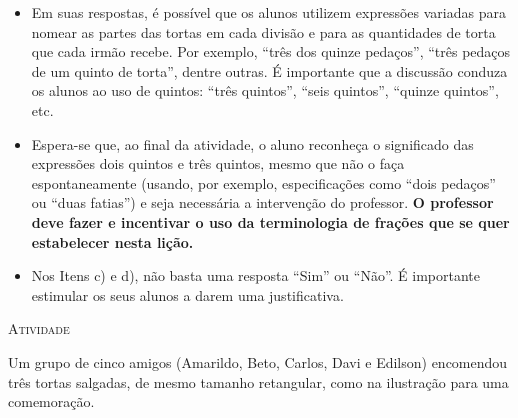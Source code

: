 \documentclass[10 pt,usenames,dvipsnames, oneside]{article}
\begin{document}
\begin{goals}
\begin{itemize}
    \item       Em suas respostas, é possível que os alunos utilizem expressões variadas para nomear as partes das tortas em cada divisão e para as quantidades de torta que cada irmão recebe. Por exemplo,       ``três dos quinze pedaços'',       ``três pedaços de um quinto de torta'', dentre outras. É importante que a discussão conduza os alunos ao uso de quintos:       ``três quintos'',       ``seis quintos'',       ``quinze quintos'', etc.
    \item       Espera-se que, ao final da atividade, o aluno reconheça o significado das expressões dois quintos e três quintos, mesmo que não o faça espontaneamente (usando, por exemplo, especificações como       ``dois pedaços''     ou       ``duas fatias'') e seja necessária a intervenção do professor. {\bf O professor deve fazer e incentivar o uso da terminologia de frações que se quer estabelecer nesta lição.}
    \item       Nos Itens c) e d), não basta uma resposta       ``Sim''     ou       ``Não''. É importante estimular os seus alunos a darem uma justificativa.
\end{itemize} %


\end{goals}

\bigskip
\begin{center}
{\large \scshape Atividade}
\end{center}
\fi

Um grupo de cinco amigos (Amarildo, Beto, Carlos, Davi e Edilson) encomendou três tortas salgadas, de mesmo tamanho retangular, como na ilustração para uma comemoração.

\begin{center}

\end{center}
\end{document}
